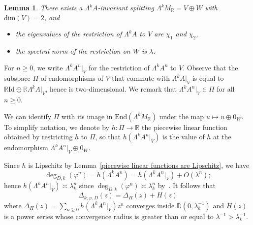 \documentclass[11pt,a4paper]{article}
\theoremstyle{plain}
\newtheorem{lemma}[theorem]{Lemma}
\theoremstyle{remark}
\theoremstyle{custombold}
\begin{document}
\begin{lemma}
   There exists a $\Lambda^k A$-invariant splitting $\Lambda^k M_\mathbb R = V \oplus W$
with $\mathrm{dim} (V) = 2$, and
    \begin{itemize}
        \item the eigenvalues of the restriction of $\Lambda^kA$ to $V$ are $\chi_1$ and $\chi_{2}$,
        \item the spectral norm of the restriction on $W$ is $\lambda$.
    \end{itemize}
\end{lemma}  

For $n\geq0$, we write $\Lambda^kA^n|_V$ for the restriction of $\Lambda^kA^n$ to $V$. Observe that the subspace $\Pi$ of endomorphisms of $V$ that commute with $\Lambda^kA|_V$ is equal to $\mathbb R \mathrm{Id} \oplus \mathbb R \Lambda^kA|_V$, hence is two-dimensional. We remark that $\Lambda^kA^n|_V\in\Pi$ for all $n\geq0$.

We can identify $\Pi$ with its image in $\mathrm{End}(\Lambda^kM_\mathbb R)$ under the map
$u \mapsto u \oplus 0_W$. To simplify notation, we denote by $h\colon \Pi \rightarrow \mathbb R$
the piecewise linear function obtained by restricting $h$ to $\Pi$, so that
$h(\Lambda^kA^n|_V)$ is the value of $h$ at the endomorphism $\Lambda^kA^n|_V \oplus 0_W$.

Since $h$ is Lipschitz by Lemma~\ref{piecewise linear functions are Lipschitz}, we have 
\[\deg_{D,k}(\varphi^n)=h(\Lambda^kA^n)=h(\Lambda^kA^n|_V)+O(\lambda^n);\] hence $h(\Lambda^kA^n|_V)\asymp \lambda_k^n$ since $\deg_{D,k}(\varphi^n)\asymp \lambda_k^n$ by~\cite[Theorem A]{Favre-Wulcan-2012}. It follows that
$$\Delta_{k,\varphi,D}(z)=\Delta_{\Pi}(z)+H(z)$$
where $\Delta_{\Pi}(z)=\sum_{n\geq0}h(\Lambda^kA^n|_V)z^n$ converges inside $\mathbb D(0,\lambda_k^{-1})$ and  $H(z)$ is a power series whose convergence radius is greater than or equal to $\lambda^{-1}>\lambda_k^{-1}$. 
\end{document}
